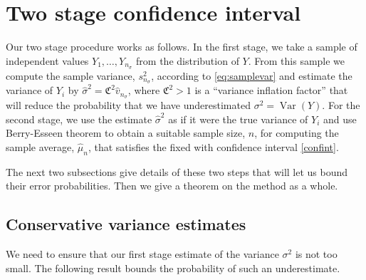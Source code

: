 \documentclass[graybox]{svmult}
\newcommand{\fudge}{\mathfrak{C}}
\DeclareMathOperator{\var}{Var}
\newcommand{\hmu}{\hat{\mu}}
\begin{document}
\section{Two stage confidence interval}\label{sec:twostage}

Our two stage procedure works as follows.
In the first stage, we take a sample of 
independent values $Y_1,\dots,Y_{n_\sigma}$
from the distribution of $Y$.
From this sample we compute the sample variance, 
$s^2_{n_\sigma}$, according to 
\eqref{eq:samplevar} and estimate
the variance of $Y_i$ by
$\hat\sigma^2 = \fudge^2\hat v_{n_\sigma}$, where
$\fudge^2>1$ is a ``variance inflation factor''
that will reduce the probability that we have
underestimated $\sigma^2=\var(Y)$.
For the second stage, we use the estimate
$\hat \sigma^2$ as if it were the true
variance of $Y_i$ and use
Berry-Esseen theorem to obtain a suitable
sample size, $n$, for computing the sample average, $\hmu_n$, that satisfies the fixed with confidence interval \eqref{confint}.

The next two subsections give details of
these two steps that will let us bound
their error probabilities. Then we give
a theorem on the method as a whole.


\subsection{Conservative variance estimates}

We need to ensure that our first stage estimate of the
variance $\sigma^2$ is not too small. The following
result bounds the probability of such an underestimate.
\end{document}
